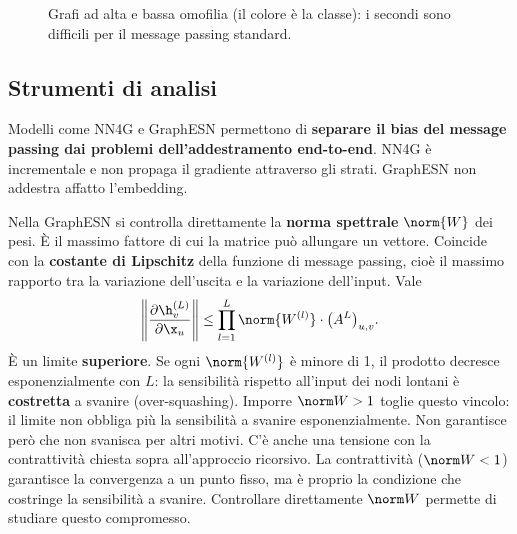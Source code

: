 \begin{figure}[ht]
\centering
{}
\caption{Grafi ad alta e bassa omofilia (il colore è la classe): i secondi sono difficili per il message passing
standard.}
\label{fig:omofilia}
\end{figure}

\subsection{Strumenti di analisi}

Modelli come NN4G e GraphESN permettono di \textbf{separare il bias del message passing dai problemi
dell'addestramento end-to-end}. NN4G è incrementale e non propaga il gradiente attraverso gli strati. GraphESN non
addestra affatto l'embedding.

Nella GraphESN si controlla direttamente la \textbf{norma spettrale} $\norm{W}$ dei pesi. È il massimo fattore di
cui la matrice può allungare un vettore. Coincide con la \textbf{costante di Lipschitz} della funzione di message
passing, cioè il massimo rapporto tra la variazione dell'uscita e la variazione dell'input. Vale
\[
\left\lVert\frac{\partial\h_v^{(L)}}{\partial\x_u}\right\rVert \le \prod_{l=1}^{L}\norm{W^{(l)}}\cdot\big(A^L\big)_{u,v}.
\]
È un limite \textbf{superiore}. Se ogni $\norm{W^{(l)}}$ è minore di 1, il prodotto decresce esponenzialmente con
$L$: la sensibilità rispetto all'input dei nodi lontani è \textbf{costretta} a svanire (over-squashing). Imporre
$\norm W>1$ toglie questo vincolo: il limite non obbliga più la sensibilità a svanire esponenzialmente. Non
garantisce però che non svanisca per altri motivi. C'è anche una tensione con la contrattività chiesta sopra
all'approccio ricorsivo. La contrattività ($\norm W<1$) garantisce la convergenza a un punto fisso, ma è proprio la
condizione che costringe la sensibilità a svanire. Controllare direttamente $\norm W$ permette di studiare questo
compromesso.

